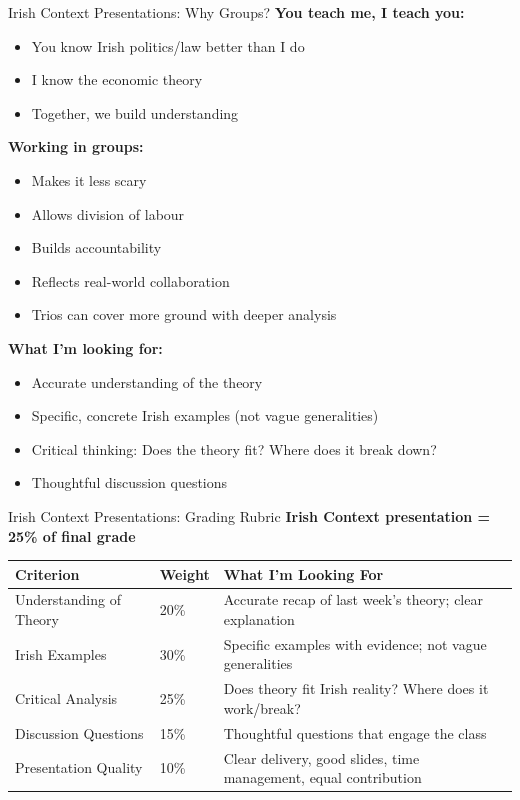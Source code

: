 \documentclass[10pt]{beamer}
\begin{document}
\begin{frame}{Irish Context Presentations: Why Groups?}
\textbf{You teach me, I teach you:}
\begin{itemize}
\item You know Irish politics/law better than I do
\item I know the economic theory
\item Together, we build understanding
\end{itemize}

\textbf{Working in groups:}
\begin{itemize}
\item Makes it less scary
\item Allows division of labour
\item Builds accountability
\item Reflects real-world collaboration
\item Trios can cover more ground with deeper analysis
\end{itemize}

\textbf{What I'm looking for:}
\begin{itemize}
\item Accurate understanding of the theory
\item Specific, concrete Irish examples (not vague generalities)
\item Critical thinking: Does the theory fit? Where does it break down?
\item Thoughtful discussion questions
\end{itemize}
\end{frame}


\begin{frame}{Irish Context Presentations: Grading Rubric}
\textbf{Irish Context presentation = 25\% of final grade}

\small
\begin{tabular}{p{3.5cm}p{1.2cm}p{5.5cm}}
\toprule
\textbf{Criterion} & \textbf{Weight} & \textbf{What I'm Looking For} \\
\midrule
Understanding of Theory & 20\% & Accurate recap of last week's theory; clear explanation \\
\addlinespace
Irish Examples & 30\% & Specific examples with evidence; not vague generalities \\
\addlinespace
Critical Analysis & 25\% & Does theory fit Irish reality? Where does it work/break? \\
\addlinespace
Discussion Questions & 15\% & Thoughtful questions that engage the class \\
\addlinespace
Presentation Quality & 10\% & Clear delivery, good slides, time management, equal contribution \\
\bottomrule
\end{tabular}
\end{frame}
\end{document}
